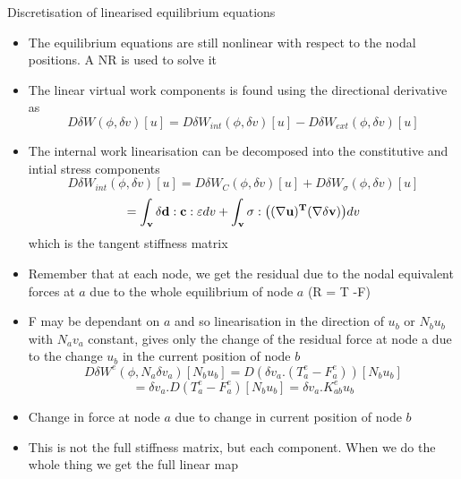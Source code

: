  
 	\begin{frame}{Discretisation of linearised equilibrium equations}
 		\begin{itemize}
 			\item The equilibrium equations are still nonlinear with respect to the nodal positions. A NR is used to solve it
 			\item The linear virtual work components is found using the directional derivative as 
 			\begin{equation}
 			D\delta W(\phi,\delta v)[u] = D \delta W_{int}(\phi,\delta v)[u] - D \delta W_{ext}(\phi,\delta v)[u]
 			\end{equation}
 			\item The internal work linearisation can be decomposed into the constitutive and intial stress components
 			\begin{equation}
 			D \delta W_{int}(\phi,\delta v)[u] =D \delta W_{C}(\phi,\delta v)[u] +D \delta W_{\sigma}(\phi,\delta v)[u] 
 			\end{equation}
 			\begin{equation}
 			 = \mathbf{\int_v \delta d:c:\varepsilon} dv + \mathbf{\int_v \sigma : \left((\nabla u)^T(\nabla \delta v) \right)} dv
 			\end{equation}
 			which is the tangent stiffness matrix
 			\end{itemize}
 	\end{frame}
 
 
 	\begin{frame}
 		\begin{itemize}
 			\item Remember that at each node, we get the residual due to the nodal equivalent forces at $a$ due to the whole equilibrium of node $a$ (R = T -F)
 			\item F may be dependant on $a$ and so linearisation in the direction of $u_b$ or $N_bu_b$ with $N_av_a$ constant, gives only the change of the residual force at node a due to the change $u_b$ in the current position of node $b$
 			\begin{equation}
 			D\delta W^e(\phi,N_a\delta v_a)[N_bu_b] = D(\delta v_a.(T_a^e - F_a^e))[N_bu_b]
 			\end{equation}
 			\begin{equation}
 			 = \delta v_a.D(T_a^e - F_a^e)[N_bu_b] = \delta v_a.K^e_{ab}u_b
 			\end{equation}
 			\item Change in force at node $a$ due to change in current position of node $b$
 			\item This is not the full stiffness matrix, but each component. When we do the whole thing we get the full linear map 
 		\end{itemize}
 	\end{frame}
 

